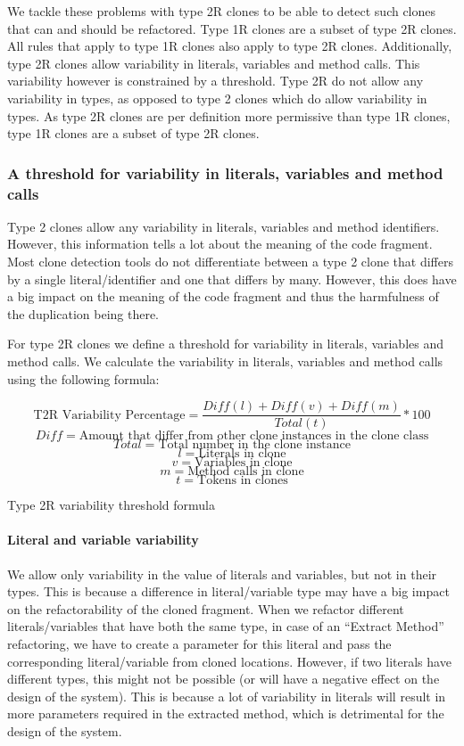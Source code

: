 We tackle these problems with type 2R clones to be able to detect such clones that can and should be refactored. Type 1R clones are a subset of type 2R clones. All rules that apply to type 1R clones also apply to type 2R clones. Additionally, type 2R clones allow variability in literals, variables and method calls. This variability however is constrained by a threshold. Type 2R do not allow any variability in types, as opposed to type 2 clones which do allow variability in types. As type 2R clones are per definition more permissive than type 1R clones, type 1R clones are a subset of type 2R clones.

\subsubsection{A threshold for variability in literals, variables and method calls}\label{sec:variabilitythreshold}
Type 2 clones allow any variability in literals, variables and method identifiers. However, this information tells a lot about the meaning of the code fragment. Most clone detection tools do not differentiate between a type 2 clone that differs by a single literal/identifier and one that differs by many. However, this does have a big impact on the meaning of the code fragment and thus the harmfulness of the duplication being there.

For type 2R clones we define a threshold for variability in literals, variables and method calls. We calculate the variability in literals, variables and method calls using the following formula:

\begin{eqfloat}\label{eq:type2r}
$$\text{T2R Variability Percentage}=\frac{Diff(l) + Diff(v) + Diff(m)}{Total(t)}*100$$
$$Diff = \text{Amount that differ from other clone instances in the clone class}$$
$$Total = \text{Total number in the clone instance}$$
$$l = \text{Literals in clone}$$
$$v = \text{Variables in clone}$$
$$m = \text{Method calls in clone}$$
$$t = \text{Tokens in clones}$$
\caption{Type 2R variability threshold formula}\end{eqfloat}

\paragraph{Literal and variable variability}
We allow only variability in the value of literals and variables, but not in their types. This is because a difference in literal/variable type may have a big impact on the refactorability of the cloned fragment. When we refactor different literals/variables that have both the same type, in case of an ``Extract Method'' refactoring, we have to create a parameter for this literal and pass the corresponding literal/variable from cloned locations. However, if two literals have different types, this might not be possible (or will have a negative effect on the design of the system). This is because a lot of variability in literals will result in more parameters required in the extracted method, which is detrimental for the design of the system.

